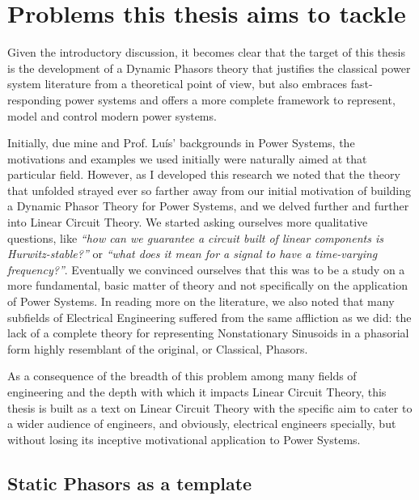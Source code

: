 \section{Problems this thesis aims to tackle}\label{subsec:intro_problems_tackle}

	Given the introductory discussion, it becomes clear that the target of this thesis is the development of a Dynamic Phasors theory that justifies the classical power system literature from a theoretical point of view, but also embraces fast-responding power systems and offers a more complete framework to represent, model and control modern power systems.

	Initially, due mine and Prof. Luís' backgrounds in Power Systems, the motivations and examples we used initially were naturally aimed at that particular field. However, as I developed this research we noted that the theory that unfolded strayed ever so farther away from our initial motivation of building a Dynamic Phasor Theory for Power Systems, and we delved further and further into Linear Circuit Theory. We started asking ourselves more qualitative questions, like \textit{``how can we guarantee a circuit built of linear components is Hurwitz-stable?''} or \textit{``what does it mean for a signal to have a time-varying frequency?''}. Eventually we convinced ourselves that this was to be a study on a more fundamental, basic matter of theory and not specifically on the application of Power Systems. In reading more on the literature, we also noted that many subfields of Electrical Engineering suffered from the same affliction as we did: the lack of a complete theory for representing Nonstationary Sinusoids in a phasorial form highly resemblant of the original, or Classical, Phasors.

	As a consequence of the breadth of this problem among many fields of engineering and the depth with which it impacts Linear Circuit Theory, this thesis is built as a text on Linear Circuit Theory with the specific aim to cater to a wider audience of engineers, and obviously, electrical engineers specially, but without losing its inceptive motivational application to Power Systems.

\subsection{Static Phasors as a template}\label{subsec:timephasor}

